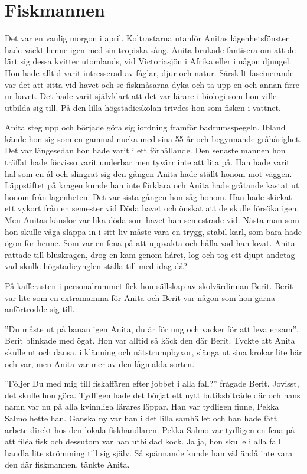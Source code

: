 \chapter[fiskmannen]{Fiskmannen}

Det var en vanlig morgon i april. Koltrastarna utanför Anitas lägenhetsfönster hade väckt henne igen med sin tropiska sång. Anita brukade fantisera om att de lärt sig dessa kvitter utomlands, vid Victoriasjön i Afrika eller i någon djungel. Hon hade alltid varit intresserad av fåglar, djur och natur. Särskilt fascinerande var det att sitta vid havet och se fiskmåsarna dyka och ta upp en och annan firre ur havet. Det hade varit självklart att det var lärare i biologi som hon ville utbilda sig till. På den lilla högstadieskolan trivdes hon som fisken i vattnet.

Anita steg upp och började göra sig iordning framför badrumsspegeln. Ibland kände hon sig som en gammal nucka med sina 55 år och begynnande gråhårighet. Det var längesedan hon hade varit i ett förhållande. Den senaste mannen hon träffat hade förvisso varit underbar men tyvärr inte att lita på. Han hade varit hal som en ål och slingrat sig den gången Anita hade ställt honom mot väggen. Läppstiftet på kragen kunde han inte förklara och Anita hade gråtande kastat ut honom från lägenheten. Det var sista gången hon såg honom. Han hade skickat ett vykort från en semester vid Döda havet och önskat att de skulle försöka igen. Men Anitas känslor var lika döda som havet han semestrade vid. Nästa man som hon skulle våga släppa in i sitt liv måste vara en trygg, stabil karl, som bara hade ögon för henne. Som var en fena på att uppvakta och hålla vad han lovat. Anita rättade till bluskragen, drog en kam genom håret, log och tog ett djupt andetag – vad skulle högstadieynglen ställa till med idag då?

På kafferasten i personalrummet fick hon sällskap av skolvärdinnan Berit. Berit var lite som en extramamma för Anita och Berit var någon som hon gärna anförtrodde sig till. 

”Du måste ut på banan igen Anita, du är för ung och vacker för att leva ensam”, Berit blinkade med ögat. Hon var alltid så käck den där Berit. Tyckte att Anita skulle ut och dansa, i klänning och nätstrumpbyxor, slänga ut sina krokar lite här och var, men Anita var mer av den lågmälda sorten. 

”Följer Du med mig till fiskaffären efter jobbet i alla fall?” frågade Berit. Jovisst, det skulle hon göra. Tydligen hade det börjat ett nytt butiksbiträde där och hans namn var nu på alla kvinnliga lärares läppar. Han var tydligen finne, Pekka Salmo hette han. Ganska ny var han i det lilla samhället och han hade fått arbete direkt hos den lokala fiskhandlaren. Pekka Salmo var tydligen en fena på att filéa fisk och dessutom var han utbildad kock. Ja ja, hon skulle i alla fall handla lite strömming till sig själv. Så spännande kunde han väl ändå inte vara den där fiskmannen, tänkte Anita.

